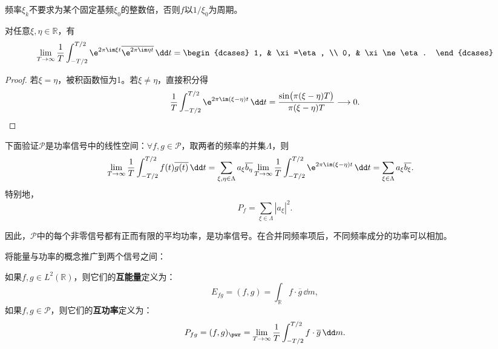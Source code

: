 频率$\xi_k$不要求为某个固定基频$\xi_0$的整数倍，否则$f$以$1/\xi_0$为周期。

\begin{proposition}[平均正交性]
    对任意$\xi,\eta\in\mathbb{R}$，有
    \begin{equation}
        \lim_{T\to\infty}\frac{1}{T}\int_{-T/2}^{T/2}
        \e^{2\pi\im\xi t}
        \overline{\e^{2\pi\im\eta t}}\,\dd t
        =\begin{dcases}
            1, & \xi=\eta,   \\
            0, & \xi\ne\eta.
        \end{dcases}
    \end{equation}
\end{proposition}
\begin{proof}
    若$\xi=\eta$，被积函数恒为1。若$\xi\ne\eta$，直接积分得
    \begin{equation}
        \frac{1}{T}\int_{-T/2}^{T/2}\e^{2\pi\im(\xi-\eta)t}\,\dd t
        =\frac{\sin\bigl(\pi(\xi-\eta)T\bigr)}{\pi(\xi-\eta)T}\longrightarrow 0.
    \end{equation}
\end{proof}

下面验证$\mathcal{P}$是功率信号中的线性空间：$\forall f,g\in\mathcal{P}$，取两者的频率的并集$\Lambda$，则
\begin{align}
    \lim_{T\to\infty}\frac{1}{T}\int_{-T/2}^{T/2}f(t)\overline{g(t)}\,\dd t
     & =\sum_{\xi,\eta\in\Lambda}a_\xi\overline{b_\eta}
    \lim_{T\to\infty}\frac{1}{T}\int_{-T/2}^{T/2}
    \e^{2\pi\im(\xi-\eta)t}\,\dd t=\sum_{\xi\in\Lambda}a_\xi\overline{b_\xi}.
\end{align}
特别地，
\begin{equation}
    P_f=\sum_{\xi\in\Lambda}|a_\xi|^2.
\end{equation}

因此，$\mathcal{P}$中的每个非零信号都有正而有限的平均功率，是功率信号。在合并同频率项后，不同频率成分的功率可以相加。

将能量与功率的概念推广到两个信号之间：
\begin{definition}[互能量与互功率]\label{def:cross_energy_power}
    如果$f,g\in L^2(\mathbb{R})$，则它们的\textbf{互能量}定义为：
    \begin{equation}
        E_{fg}=(f,g)=\int_{\mathbb{R}}f\cdot \overline{g}\,\dd m,
    \end{equation}
    如果$f,g\in \mathcal{P}$，则它们的\textbf{互功率}定义为：
    \begin{equation}
        P_{fg}=(f,g)_{\pwr}=\lim_{T\to\infty}\frac{1}{T}\int_{-T/2}^{T/2}f\cdot\overline{g}\,\dd m.
    \end{equation}
\end{definition}

